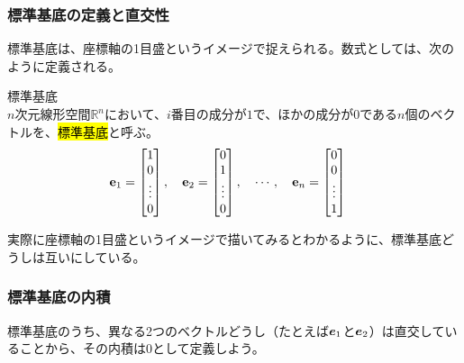 \documentclass[../../imaging-math]{subfiles}
\begin{document}
\subsubsection{標準基底の定義と直交性}

標準基底は、座標軸の1目盛というイメージで捉えられる。数式としては、次のように定義される。

\begin{definition}{標準基底}\quad\\
  $n$次元線形空間$\mathbb{R}^n$において、$i$番目の成分が$1$で、ほかの成分が$0$である$n$個のベクトルを、\hl{標準基底}と呼ぶ。
  \large
  \begin{align*}
    \vb{e}_1 & = \begin{bmatrix}
                   1      \\
                   0      \\
                   \vdots \\
                   0
                 \end{bmatrix}, \quad
    \vb{e}_2 = \begin{bmatrix}
                 0      \\
                 1      \\
                 \vdots \\
                 0
               \end{bmatrix}, \quad
    \cdots, \quad
    \vb{e}_n = \begin{bmatrix}
                 0      \\
                 0      \\
                 \vdots \\
                 1
               \end{bmatrix}
  \end{align*}
\end{definition}

実際に座標軸の1目盛というイメージで描いてみるとわかるように、標準基底どうしは互いにしている。


\subsubsection{標準基底の内積}

標準基底のうち、異なる2つのベクトルどうし（たとえば$\vb*{e}_1$と$\vb*{e}_2$）は直交していることから、その内積は$0$として定義しよう。
\end{document}
